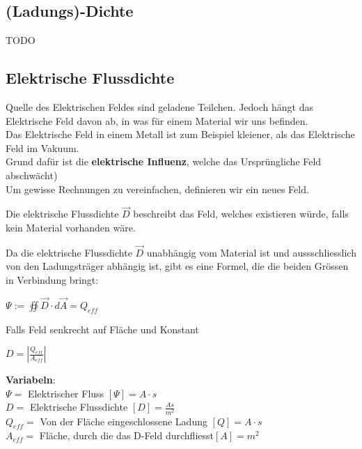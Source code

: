 					\subsection{(Ladungs)-Dichte}
					TODO


					\subsection{Elektrische Flussdichte}
					Quelle des Elektrischen Feldes sind geladene Teilchen. Jedoch hängt das Elektrische Feld davon ab, in was für einem Material wir uns befinden. \\
					Das Elektrische Feld in einem Metall ist zum Beispiel kleiener, als das Elektrische Feld im Vakuum. \\
					Grund dafür ist die \textbf{elektrische Influenz}, welche das Ursprüngliche Feld abschwächt) \\
					Um gewisse Rechnungen zu vereinfachen, definieren wir ein neues Feld.

					\beginip
					Die elektrische Flussdichte $\vec{D}$ beschreibt das Feld, welches existieren würde, falls kein Material vorhanden wäre.
					\iend

					Da die elektrische Flussdichte  $\vec{D}$ unabhängig vom Material ist und aussschliesslich von den Ladungsträger abhängig ist,
					gibt es eine Formel, die die beiden Grössen in Verbindung bringt:

					\begingl
					\begin{center}
						\formulaBegin
						$\Psi := \oiint \vec{D}\cdot d\vec{A} = Q_{eff}$
						\formulaEnd

						Falls Feld senkrecht auf Fläche und Konstant \\
						\fspace

							\formulaBegin
							$D = |\frac{Q_{eff}}{A_{eff}}|$
							\formulaEnd

						\end{center}
						\textbf{Variabeln}: \\
						$\Psi = $ Elektrischer Fluss $ [\Psi] = A \cdot s $ \\
						$D = $ Elektrische Flussdichte $ [D] = \frac{As}{m^2}$ \\
						$ Q_{eff} = $ Von der Fläche eingeschlossene Ladung $[Q] = A\cdot s$ \\
						$ A_{eff} = $ Fläche, durch die das D-Feld durchfliesst$ [A] = m^2$ \\

